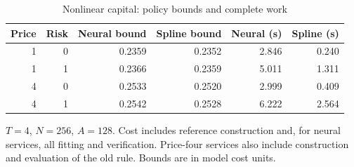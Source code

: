 \begin{table}[htbp]
\centering\small\setlength{\tabcolsep}{5pt}
\caption{Nonlinear capital: policy bounds and complete work}\label{tab:r39nonlinear}
\begin{tabular}{rrrrrr}
\toprule
Price & Risk & Neural bound & Spline bound & Neural (s) & Spline (s)\\
\midrule
1 & 0 & 0.2359 & 0.2352 & 2.846 & 0.240\\
1 & 1 & 0.2366 & 0.2359 & 5.011 & 1.311\\
4 & 0 & 0.2533 & 0.2520 & 2.999 & 0.409\\
4 & 1 & 0.2542 & 0.2528 & 6.222 & 2.564\\
\bottomrule
\end{tabular}
\par\smallskip\begin{minipage}{.96\linewidth}\footnotesize $T=4$, $N=256$, $A=128$. Cost includes reference construction and, for neural services, all fitting and verification. Price-four services also include construction and evaluation of the old rule. Bounds are in model cost units.\end{minipage}
\end{table}
